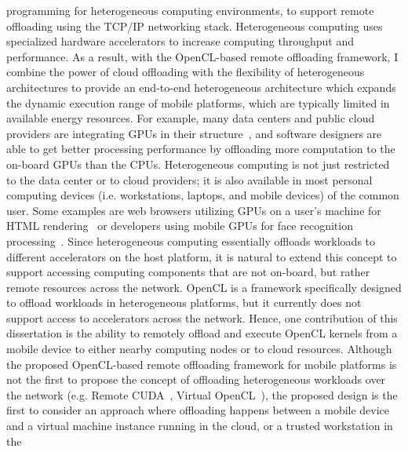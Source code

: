 programming for heterogeneous computing environments, to support remote
offloading using the TCP/IP networking stack.
%
Heterogeneous computing uses specialized hardware accelerators to
increase computing throughput and performance.
%
As a result, with the OpenCL-based remote offloading framework, I combine the
power of cloud offloading with the flexibility of
heterogeneous architectures to provide an end-to-end heterogeneous
architecture which expands the dynamic execution range of mobile
platforms, which are typically limited in available energy resources.
%
For example, many data centers and public cloud providers are
integrating GPUs in their structure~\cite{bowman}, and software
designers are able to get better processing performance by offloading
more computation to the on-board GPUs than the CPUs.
%
Heterogeneous computing is not just restricted to the data center or to
cloud providers; it is also available in most personal computing
devices (i.e. workstations, laptops, and mobile devices) of the common
user.
%
Some examples are web browsers utilizing GPUs on a user's machine for
HTML rendering~\cite{paul} or developers using mobile GPUs for face
recognition processing~\cite{burns}.
%
Since heterogeneous computing essentially offloads workloads to
different accelerators on the host platform, it is natural
to extend this concept to support accessing computing components that are not
on-board, but rather remote resources across the network.
%
%
%
OpenCL is a framework specifically designed to offload workloads in
heterogeneous platforms, but it currently does not support access to
accelerators across the network.
%
Hence, one contribution of this dissertation is the ability to remotely
offload and execute OpenCL kernels from a mobile device to either nearby
computing nodes or to cloud resources.
%
Although the proposed OpenCL-based remote offloading framework for mobile
platforms is not the first to propose the concept of offloading
heterogeneous workloads over the network (e.g. Remote CUDA~\cite{rcuda},
Virtual OpenCL~\cite{vocl}), the proposed design is the first to
consider an approach where offloading happens between a mobile device and a virtual
machine instance running in the cloud, or a trusted workstation in the
